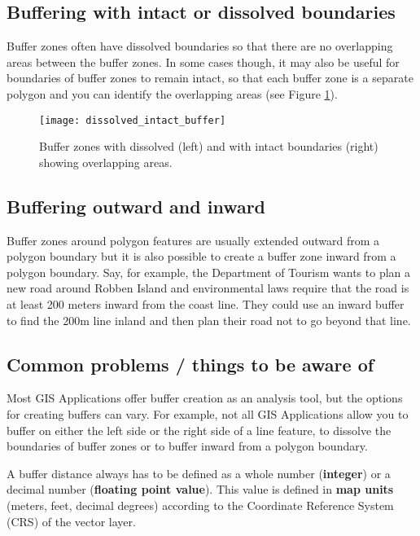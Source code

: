 \subsection{Buffering with intact or dissolved boundaries}

Buffer zones often have dissolved boundaries so that there are no overlapping
areas between the buffer zones. In some cases though, it may also be useful
for boundaries of buffer zones to remain intact, so that each buffer zone is
a separate polygon and you can identify the overlapping areas (see Figure
\ref{fig:buffertypes}).

\begin{figure}[ht]
   \begin{center}
   \caption{Buffer zones with dissolved (left) and with intact boundaries
(right) showing overlapping areas.}
\label{fig:buffertypes}\smallskip
   \texttt{[image: dissolved\_intact\_buffer]}
\end{center}
\end{figure}

\subsection{Buffering outward and inward}

Buffer zones around polygon features are usually extended outward from a
polygon boundary but it is also possible to create a buffer zone inward from
a polygon boundary. Say, for example, the Department of Tourism wants to plan
a new road around Robben Island and environmental laws require that the road
is at least 200 meters inward from the coast line. They could use an inward
buffer to find the 200m line inland and then plan their road not to go beyond
that line.

\subsection{Common problems / things to be aware of}

Most GIS Applications offer buffer creation as an analysis tool, but the
options for creating buffers can vary. For example, not all GIS Applications
allow you to buffer on either the left side or the right side of a line
feature, to dissolve the boundaries of buffer zones or to buffer inward from
a polygon boundary.

A buffer distance always has to be defined as a whole number
(\textbf{integer}) or a decimal number (\textbf{floating point value}). This
value is defined in \textbf{map units} (meters, feet, decimal degrees)
according to the Coordinate Reference System (CRS) of the vector layer. 

